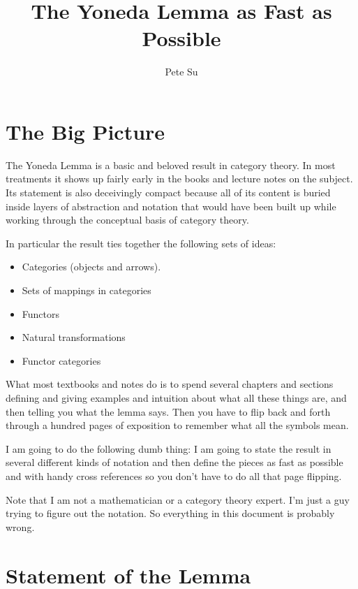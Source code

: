 \documentclass[12pt]{article}
\theoremstyle{definition}
\theoremstyle{definition}
\theoremstyle{definition}
\numberwithin{equation}{section}
\begin{document}
\title{The Yoneda Lemma as Fast as Possible}
\author{Pete Su}

\maketitle
\newpage

\section{The Big Picture}

The Yoneda Lemma is a basic and beloved result in category theory. In most treatments it
shows up fairly early in the books and lecture notes on the subject. Its
statement is also deceivingly compact because all of its content is buried inside layers
of abstraction and notation that would have been built up while working through the
conceptual basis of category theory.

In particular the result ties together the following sets of ideas:

\begin{itemize}

\item Categories (objects and arrows).
\item Sets of mappings in categories
\item Functors
\item Natural transformations
\item Functor categories

\end{itemize}

\noindent
What most textbooks and notes do is to spend several chapters and sections defining and
giving examples and intuition about what all these things are, and then telling you what
the lemma says. Then you have to flip back and forth through a hundred pages of exposition
to remember what all the symbols mean.

I am going to do the following dumb thing: I am going to state the result in several
different kinds of notation and then define the pieces as fast as possible and with handy cross references
so you don't have to do all that page flipping.

Note that I am not a mathematician or a category theory expert. I'm just a guy trying to
figure out the notation. So everything in this document is probably wrong.

\section{Statement of the Lemma}
\end{document}
